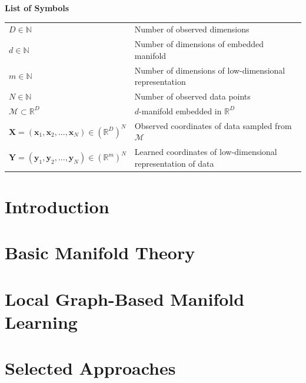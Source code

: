 \documentclass[12pt]{article}
\newcommand{\mani}{\mathcal{M}}
\newcommand{\N}{\mathbb{N}}
\newcommand{\R}{\mathbb{R}}
\newcommand{\RD}{\mathbb{R}^D}
\begin{document}
\tableofcontents
\newpage

\Large
\noindent
\textbf{List of Symbols}
\vspace{0.5cm} \\
\noindent
\normalsize

\begin{tabularx}{\textwidth}{ 
  >{\raggedleft\arraybackslash}X 
  >{\raggedright\arraybackslash}X}
  $D \in \N$ & Number of observed dimensions \\
  $d \in \N$ & Number of dimensions of embedded manifold \\
  $m \in \N$ & Number of dimensions of low-dimensional representation \\
  $N \in \N$ & Number of observed data points \\
  $\mani \subset \RD$ & $d$-manifold embedded in $\RD$ \\
  $\bm{X} = (\bm{x}_1, \bm{x}_2, ..., \bm{x}_N) \in (\RD)^N$ & Observed 
  coordinates of data sampled from $\mani$ \\
  $\bm{Y} = (\bm{y}_1, \bm{y}_2, ..., \bm{y}_N) \in (\R^m)^N$ & Learned 
  coordinates of low-dimensional representation of data
\end{tabularx}

\newpage

\listoffigures
\newpage
\listoftables
\newpage


    
\section{Introduction}
\label{intro}


\section{Basic Manifold Theory}
\label{math}


\section{Local Graph-Based Manifold Learning}
\label{lgb-mani-learn}


\section{Selected Approaches}
\label{techniques}

\end{document}
